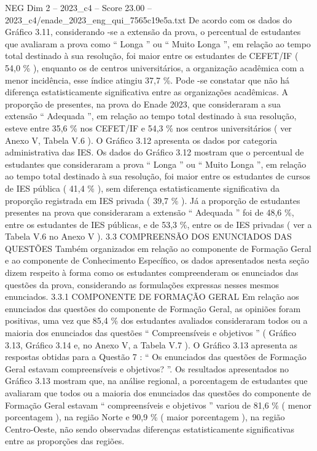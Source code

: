 \begin{textsample}{NEG Dim 2 – 2023\_c4 – Score 23.00 – 2023\_c4/enade\_2023\_eng\_qui\_7565c19e5a.txt}
De acordo com os dados do Gráfico 3.11, considerando -se a extensão da prova, o percentual de estudantes que avaliaram a prova como “ Longa ” ou “ Muito Longa ”, em relação ao tempo total destinado à sua resolução, foi maior entre os estudantes de CEFET/IF ( 54,0 \% ), enquanto os de centros universitários, a organização acadêmica com a menor incidência, esse índice atingiu 37,7 \%.
Pode -se constatar que não há diferença estatisticamente significativa entre as organizações acadêmicas.
A proporção de presentes, na prova do Enade 2023, que consideraram a sua extensão “ Adequada ”, em relação ao tempo total destinado à sua resolução, esteve entre 35,6 \% nos CEFET/IF e 54,3 \% nos centros universitários ( ver Anexo V, Tabela V.6 ).
O Gráfico 3.12 apresenta os dados por categoria administrativa das IES.
Os dados do Gráfico 3.12 mostram que o percentual de estudantes que consideraram a prova “ Longa ” ou “ Muito Longa ”, em relação ao tempo total destinado à sua resolução, foi maior entre os estudantes de cursos de IES pública ( 41,4 \% ), sem diferença estatisticamente significativa da proporção registrada em IES privada ( 39,7 \% ).
Já a proporção de estudantes presentes na prova que consideraram a extensão “ Adequada ” foi de 48,6 \%, entre os estudantes de IES públicas, e de 53,3 \%, entre os de IES privadas ( ver a Tabela V.6 no Anexo V ). 3.3 COMPREENSÃO DOS ENUNCIADOS DAS QUESTÕES Também organizados em relação ao componente de Formação Geral e ao componente de Conhecimento Específico, os dados apresentados nesta seção dizem respeito à forma como os estudantes compreenderam os enunciados das questões da prova, considerando as formulações expressas nesses mesmos enunciados. 3.3.1 COMPONENTE DE FORMAÇÃO GERAL Em relação aos enunciados das questões do componente de Formação Geral, as opiniões foram positivas, uma vez que 85,4 \% dos estudantes avaliados consideraram todos ou a maioria dos enunciados das questões “ Compreensíveis e objetivos ” ( Gráfico 3.13, Gráfico 3.14 e, no Anexo V, a Tabela V.7 ).
O Gráfico 3.13 apresenta as respostas obtidas para a Questão 7 : “ Os enunciados das questões de Formação Geral estavam compreensíveis e objetivos? ”.
Os resultados apresentados no Gráfico 3.13 mostram que, na análise regional, a porcentagem de estudantes que avaliaram que todos ou a maioria dos enunciados das questões do componente de Formação Geral estavam “ compreensíveis e objetivos ” variou de 81,6 \% ( menor porcentagem ), na região Norte e 90,9 \% ( maior porcentagem ), na região Centro-Oeste, não sendo observadas diferenças estatisticamente significativas entre as proporções das regiões.

\end{textsample}
